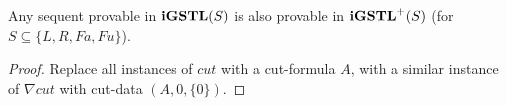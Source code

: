 \begin{thm}\label{cor:nc-riddance-i} Any sequent provable in $\mathbf{iGSTL}(S)$ is also provable in $\mathbf{iGSTL}^+(S)$ (for $S \subseteq \{L, R, Fa, Fu\}$).
\end{thm}
\begin{proof}
	Replace all instances of $cut$ with a cut-formula $A$, with a similar instance of $\nabla cut$ with cut-data $(A, 0, \{0\})$.
\end{proof}